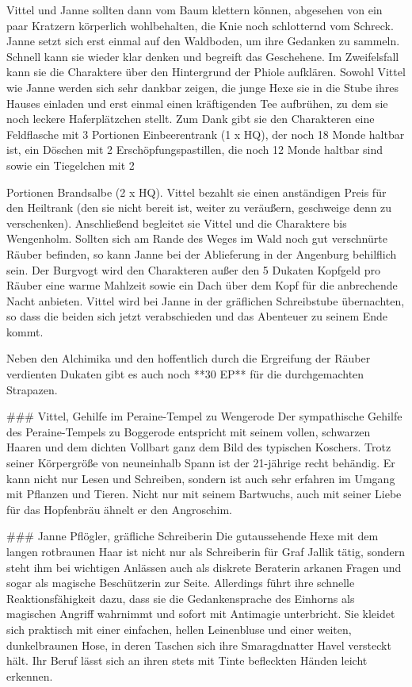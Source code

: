 Vittel und Janne sollten dann vom Baum klettern können, abgesehen von ein paar Kratzern körperlich wohlbehalten, die Knie noch schlotternd vom Schreck. Janne setzt sich erst einmal auf den Waldboden, um ihre Gedanken zu sammeln. Schnell kann sie wieder klar denken und begreift das Geschehene. Im Zweifelsfall kann sie die Charaktere über den Hintergrund der Phiole aufklären. Sowohl Vittel wie Janne werden sich sehr dankbar zeigen, die junge Hexe sie in die Stube ihres Hauses einladen und erst einmal einen kräftigenden Tee aufbrühen, zu dem sie noch leckere Haferplätzchen stellt. Zum Dank gibt sie den Charakteren eine Feldflasche mit 3 Portionen Einbeerentrank (1 x HQ), der noch 18 Monde haltbar ist, ein Döschen mit 2 Erschöpfungspastillen, die noch 12 Monde haltbar sind sowie ein Tiegelchen mit 2 




Portionen Brandsalbe (2 x HQ). Vittel bezahlt sie einen anständigen Preis für den Heiltrank (den sie nicht bereit ist, weiter zu veräußern, geschweige denn zu verschenken).
\platz
Anschließend begleitet sie Vittel und die Charaktere bis Wengenholm. Sollten sich am Rande des Weges im Wald noch gut verschnürte Räuber befinden, so kann Janne bei der Ablieferung in der Angenburg behilflich sein. Der Burgvogt wird den Charakteren außer den 5 Dukaten Kopfgeld pro Räuber eine warme Mahlzeit sowie ein Dach über dem Kopf für die anbrechende Nacht anbieten. Vittel wird bei Janne in der gräflichen Schreibstube übernachten, so dass die beiden sich jetzt verabschieden und das Abenteuer zu seinem Ende kommt. 

Neben den Alchimika und den hoffentlich durch die Ergreifung der Räuber verdienten Dukaten gibt es auch noch **30 EP** für die durchgemachten Strapazen.


 




### Vittel, Gehilfe im Peraine-Tempel zu Wengerode
Der sympathische Gehilfe des Peraine-Tempels zu Boggerode entspricht mit seinem vollen, schwarzen Haaren und dem dichten Vollbart ganz dem Bild des typischen Koschers. Trotz seiner Körpergröße von neuneinhalb Spann ist der 21-jährige recht behändig. Er kann nicht nur Lesen und Schreiben, sondern ist auch sehr erfahren im Umgang mit Pflanzen und Tieren. Nicht nur mit seinem Bartwuchs, auch mit seiner Liebe für das Hopfenbräu ähnelt er den Angroschim.



### Janne Pflögler, gräfliche Schreiberin
Die gutaussehende Hexe mit dem langen rotbraunen Haar ist nicht nur als Schreiberin für Graf Jallik tätig, sondern steht ihm bei wichtigen Anlässen auch als diskrete Beraterin arkanen Fragen und sogar als magische Beschützerin zur Seite. Allerdings führt ihre schnelle Reaktionsfähigkeit dazu, dass sie die Gedankensprache des Einhorns als magischen Angriff wahrnimmt und sofort mit Antimagie unterbricht.
Sie kleidet sich praktisch mit einer einfachen, hellen Leinenbluse und einer weiten, dunkelbraunen Hose, in deren Taschen sich ihre Smaragdnatter Havel versteckt hält. Ihr Beruf lässt sich an ihren stets mit Tinte befleckten Händen leicht erkennen.

